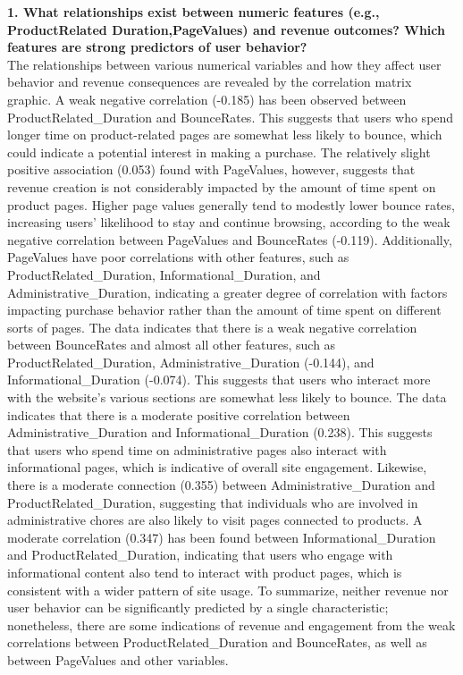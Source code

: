 \documentclass[12pt]{article}
\begin{document}
\textbf{1. What relationships exist between numeric features (e.g., ProductRelated Duration,PageValues) and revenue outcomes? Which features are strong predictors of user behavior?} \\[5pt] %

The relationships between various numerical variables and how they affect user behavior and revenue consequences are revealed by the correlation matrix graphic. A weak negative correlation (-0.185) has been observed between ProductRelated\_Duration and BounceRates. This suggests that users who spend longer time on product-related pages are somewhat less likely to bounce, which could indicate a potential interest in making a purchase. The relatively slight positive association (0.053) found with PageValues, however, suggests that revenue creation is not considerably impacted by the amount of time spent on product pages. Higher page values generally tend to modestly lower bounce rates, increasing users' likelihood to stay and continue browsing, according to the weak negative correlation between PageValues and BounceRates (-0.119). Additionally, PageValues have poor correlations with other features, such as ProductRelated\_Duration, Informational\_Duration, and Administrative\_Duration, indicating a greater degree of correlation with factors impacting purchase behavior rather than the amount of time spent on different sorts of pages. The data indicates that there is a weak negative correlation between BounceRates and almost all other features, such as ProductRelated\_Duration, Administrative\_Duration (-0.144), and Informational\_Duration (-0.074). This suggests that users who interact more with the website's various sections are somewhat less likely to bounce. The data indicates that there is a moderate positive correlation between Administrative\_Duration and Informational\_Duration (0.238). This suggests that users who spend time on administrative pages also interact with informational pages, which is indicative of overall site engagement. Likewise, there is a moderate connection (0.355) between Administrative\_Duration and ProductRelated\_Duration, suggesting that individuals who are involved in administrative chores are also likely to visit pages connected to products. A moderate correlation (0.347) has been found between Informational\_Duration and ProductRelated\_Duration, indicating that users who engage with informational content also tend to interact with product pages, which is consistent with a wider pattern of site usage. To summarize, neither revenue nor user behavior can be significantly predicted by a single characteristic; nonetheless, there are some indications of revenue and engagement from the weak correlations between ProductRelated\_Duration and BounceRates, as well as between PageValues and other variables.
\end{document}
